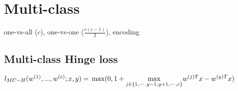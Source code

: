 \section*{Multi-class}
\noindent one-vs-all ($c$), one-vs-one ($\frac{c (c-1)}{2}$), encoding

\subsection*{Multi-class Hinge loss}
\noindent $l_{MC-H}(w^{(1)},...,w^{(c)};x,y) =\\
\max (0,1+\underset{j\in\{1,\cdots,y-1,y+1,\cdots,c\}}{\max} w^{(j)T} x - w^{(y)T} x)$